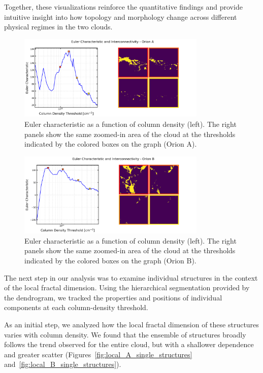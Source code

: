 Together, these visualizations reinforce the quantitative findings and provide intuitive insight into how topology and morphology change across different physical regimes in the two clouds.

\begin{figure}[t]
    \centering
    \includegraphics[width=0.8\textwidth]{figures/euler_Orion_A.png}
    \caption{Euler characteristic as a function of column density (left). The right panels show the same zoomed-in area of the cloud at the thresholds indicated by the colored boxes on the graph (Orion A).}
    \label{fig:Euler_Orion_A}
\end{figure}

\begin{figure}[t]
    \centering
    \includegraphics[width=0.8\textwidth]{figures/euler_Orion_B.png}
    \caption{Euler characteristic as a function of column density (left). The right panels show the same zoomed-in area of the cloud at the thresholds indicated by the colored boxes on the graph (Orion B).}
    \label{fig:Euler_Orion_B}
\end{figure}

The next step in our analysis was to examine individual structures in the context of the local fractal dimension.  
Using the hierarchical segmentation provided by the dendrogram, we tracked the properties and positions of individual components at each column-density threshold.

As an initial step, we analyzed how the local fractal dimension of these structures varies with column density.  
We found that the ensemble of structures broadly follows the trend observed for the entire cloud, but with a shallower dependence and greater scatter (Figures~\ref{fig:local_A_single_structures} and~\ref{fig:local_B_single_structures}).  


